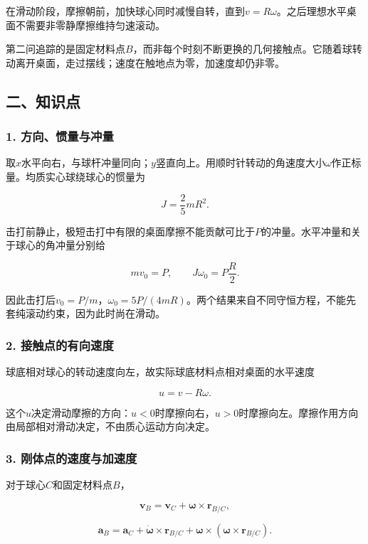\documentclass[12pt,a4paper,fontset=fandol]{ctexart}
\begin{document}
在滑动阶段，摩擦朝前，加快球心同时减慢自转，直到\(v=R\omega\)。之后理想水平桌面不需要非零静摩擦维持匀速滚动。

第二问追踪的是固定材料点\(B\)，而非每个时刻不断更换的几何接触点。它随着球转动离开桌面，走过摆线；速度在触地点为零，加速度却仍非零。

\subsection{二、知识点}\label{ux4e8cux77e5ux8bc6ux70b9-1}

\subsubsection{1.
方向、惯量与冲量}\label{ux65b9ux5411ux60efux91cfux4e0eux51b2ux91cf}

取\(x\)水平向右，与球杆冲量同向；\(y\)竖直向上。用顺时针转动的角速度大小\(\omega\)作正标量。均质实心球绕球心的惯量为

\[
J=\frac25mR^2.
\]

击打前静止，极短击打中有限的桌面摩擦不能贡献可比于\(P\)的冲量。水平冲量和关于球心的角冲量分别给

\[
mv_0=P,\qquad J\omega_0=P\frac R2.
\]

因此击打后\(v_0=P/m\)，\(\omega_0=5P/(4mR)\)。两个结果来自不同守恒方程，不能先套纯滚动约束，因为此时尚在滑动。

\subsubsection{2.
接触点的有向速度}\label{ux63a5ux89e6ux70b9ux7684ux6709ux5411ux901fux5ea6}

球底相对球心的转动速度向左，故实际球底材料点相对桌面的水平速度

\[
u=v-R\omega.
\]

这个\(u\)决定滑动摩擦的方向：\(u<0\)时摩擦向右，\(u>0\)时摩擦向左。摩擦作用方向由局部相对滑动决定，不由质心运动方向决定。

\subsubsection{3.
刚体点的速度与加速度}\label{ux521aux4f53ux70b9ux7684ux901fux5ea6ux4e0eux52a0ux901fux5ea6}

对于球心\(C\)和固定材料点\(B\)，

\[
\mathbf v_B=\mathbf v_C+\boldsymbol\omega\times\mathbf r_{B/C},
\]

\[
\mathbf a_B=\mathbf a_C+
\dot{\boldsymbol\omega}\times\mathbf r_{B/C}
+\boldsymbol\omega\times
(\boldsymbol\omega\times\mathbf r_{B/C}).
\]
\end{document}
